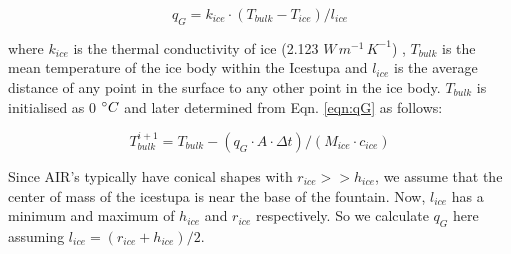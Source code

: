 \documentclass[utf8]{frontiersSCNS} %
\begin{document}
\begin{equation} q_{G} = k_{ice} \cdot (T_{bulk}-T_{ice})/l_{ice} \label{eqn:qG}    \end{equation}

where $k_{ice}$ is the thermal conductivity of ice (2.123 $W\, m^{-1}\,K^{-1}$) , $T_{bulk}$ is the mean temperature of
the ice body within the Icestupa and $l_{ice}$ is the average distance of any point in the surface to any other point in
the ice body. $T_{bulk}$ is initialised as 0 $\degree C$ and later determined from Eqn. \ref{eqn:qG} as follows:

\begin{equation} T_{bulk}^{i+1} = T_{bulk} - (q_{G} \cdot A \cdot \Delta t)/(M_{ice} \cdot c_{ice}) \end{equation}

Since AIR's typically have conical shapes with $r_{ice} >> h_{ice}$, we assume that the center of mass of the
icestupa is near the base of the fountain. Now, $l_{ice}$ has a minimum and maximum of $h_{ice}$ and $r_{ice}$
respectively. So we calculate $q_{G}$ here assuming $l_{ice} = (r_{ice} + h_{ice})/2$.
\end{document}
